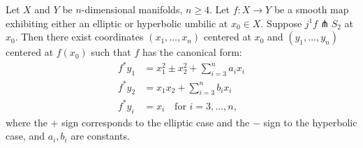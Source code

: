Let $X$ and $Y$ be $n$-dimensional manifolds, $n \geq 4$. Let $f: X \to Y$ be a smooth map exhibiting either an elliptic or hyperbolic umbilic at $x_0 \in X$. Suppose $j^1 f \pitchfork S_2$ at $x_0$. Then there exist coordinates $(x_1, \ldots, x_n)$ centered at $x_0$ and $(y_1, \ldots, y_n)$ centered at $f(x_0)$ such that $f$ has the canonical form:
\begin{align*}
f^* y_1 &= x_1^2 \pm x_2^2 + \sum_{i=3}^n a_i x_i \\
f^* y_2 &= x_1 x_2 + \sum_{i=3}^n b_i x_i \\
f^* y_i &= x_i \quad \text{for } i = 3, \ldots, n,
\end{align*}
where the $+$ sign corresponds to the elliptic case and the $-$ sign to the hyperbolic case, and $a_i, b_i$ are constants.
